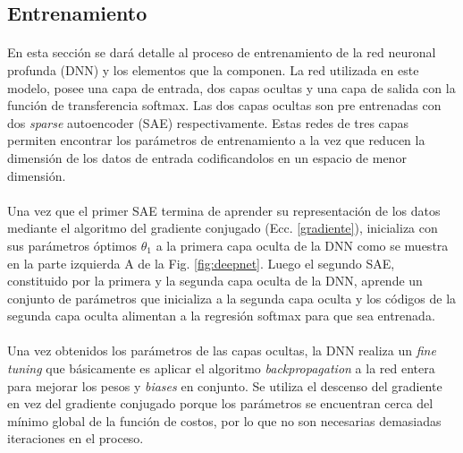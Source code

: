 \documentclass[12pt]{article}%
\begin{document}
\subsection{Entrenamiento}
\label{sec:training}

\paragraph{}
En esta sección se dará detalle al proceso de entrenamiento de la red neuronal profunda (DNN) y los elementos que la componen. La red utilizada en este modelo, posee una capa de entrada, dos capas ocultas y una capa de salida con la función de transferencia softmax. Las dos capas ocultas son pre entrenadas con dos \textit{sparse} autoencoder (SAE) respectivamente. Estas redes de tres capas permiten encontrar los parámetros de entrenamiento a la vez que reducen la dimensión de los datos de entrada codificandolos en un espacio de menor dimensión. 

\paragraph{}
Una vez que el primer SAE termina de aprender su representación de los datos mediante el algoritmo del gradiente conjugado (Ecc. \ref{gradiente}), inicializa con sus parámetros óptimos $\theta_{1}$ a la primera capa oculta de la DNN como se muestra en la parte izquierda A de la Fig. \ref{fig:deepnet}. Luego el segundo SAE, constituido por la primera y la segunda capa oculta de la DNN, aprende un conjunto de parámetros que inicializa a la segunda capa oculta y los códigos de la segunda capa oculta alimentan a la regresión softmax para que sea entrenada.

\paragraph{}
Una vez obtenidos los parámetros de las capas ocultas, la DNN realiza un \textit{fine tuning} que básicamente es aplicar el algoritmo \textit{backpropagation} a la red entera para mejorar los pesos y \textit{biases} en conjunto. Se utiliza el descenso del gradiente en vez del gradiente conjugado porque los parámetros se encuentran cerca del mínimo global de la función de costos, por lo que no son necesarias demasiadas iteraciones en el proceso.
\end{document}
